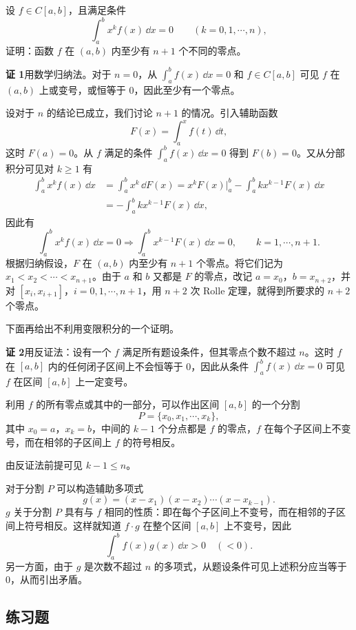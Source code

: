 \begin{xexample}[10.3.3]
设 $f\in C[a,b]$，且满足条件
\[
  \int_a^b x^k f(x)\,\dd x=0\qquad(k=0,1,\cdots,n),
\]
证明：函数 $f$ 在 $(a,b)$ 内至少有 $n+1$ 个不同的零点。
\end{xexample}
\begin{xsolution}
\textbf{证 1}\quad 用数学归纳法。对于 $n=0$，从 $\int_a^b f(x)\,\dd x=0$ 和 $f\in C[a,b]$ 可见 $f$ 在 $(a,b)$ 上或变号，或恒等于 0，因此至少有一个零点。

设对于 $n$ 的结论已成立，我们讨论 $n+1$ 的情况。引入辅助函数
\[
  F(x)=\int_a^x f(t)\,\dd t,
\]
这时 $F(a)=0$。从 $f$ 满足的条件 $\int_a^b f(x)\,\dd x=0$ 得到 $F(b)=0$。又从分部积分可见对 $k\geqslant1$ 有
\begin{align*}
  \int_a^b x^k f(x)\,\dd x
  &=\int_a^b x^k\,\dd F(x)
  =x^kF(x)\Big|_a^b-\int_a^b kx^{k-1}F(x)\,\dd x\\
  &=-\int_a^b kx^{k-1}F(x)\,\dd x,
\end{align*}
因此有
\[
  \int_a^b x^k f(x)\,\dd x=0
  \Longrightarrow
  \int_a^b x^{k-1}F(x)\,\dd x=0,
  \qquad k=1,\cdots,n+1.
\]
根据归纳假设，$F$ 在 $(a,b)$ 内至少有 $n+1$ 个零点。将它们记为 $x_1<x_2<\cdots<x_{n+1}$。由于 $a$ 和 $b$ 又都是 $F$ 的零点，改记 $a=x_0$，$b=x_{n+2}$，并对 $[x_i,x_{i+1}]$，$i=0,1,\cdots,n+1$，用 $n+2$ 次 Rolle 定理，就得到所要求的 $n+2$ 个零点。

下面再给出不利用变限积分的一个证明。

\textbf{证 2}\quad 用反证法：设有一个 $f$ 满足所有题设条件，但其零点个数不超过 $n$。这时 $f$ 在 $[a,b]$ 内的任何闭子区间上不会恒等于 0，因此从条件 $\int_a^b f(x)\,\dd x=0$ 可见 $f$ 在区间 $[a,b]$ 上一定变号。

利用 $f$ 的所有零点或其中的一部分，可以作出区间 $[a,b]$ 的一个分割
\[
  P=\{x_0,x_1,\cdots,x_k\},
\]
其中 $x_0=a$，$x_k=b$，中间的 $k-1$ 个分点都是 $f$ 的零点，$f$ 在每个子区间上不变号，而在相邻的子区间上 $f$ 的符号相反。

由反证法前提可见 $k-1\leqslant n$。

对于分割 $P$ 可以构造辅助多项式
\[
  g(x)=(x-x_1)(x-x_2)\cdots(x-x_{k-1}).
\]
$g$ 关于分割 $P$ 具有与 $f$ 相同的性质：即在每个子区间上不变号，而在相邻的子区间上符号相反。这样就知道 $f\cdot g$ 在整个区间 $[a,b]$ 上不变号，因此
\[
  \int_a^b f(x)g(x)\,\dd x>0\quad(<0).
\]
另一方面，由于 $g$ 是次数不超过 $n$ 的多项式，从题设条件可见上述积分应当等于 0，从而引出矛盾。
\end{xsolution}

\subsection{练习题}

